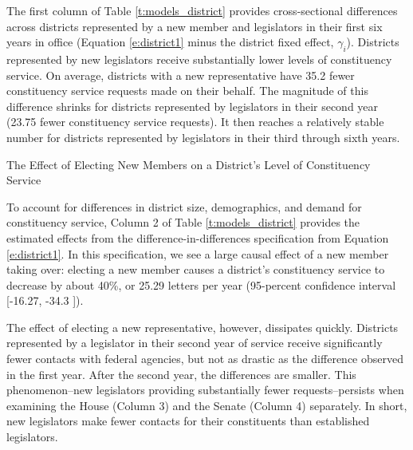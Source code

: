 \documentclass[12pt]{article}
\begin{document}
The first column of Table \ref{t:models_district} provides cross-sectional differences across districts represented by a new member and legislators in their first six years in office (Equation \ref{e:district1} minus the district fixed effect, $\gamma_{i}$). Districts represented by new legislators receive substantially lower levels of constituency service. On average, districts with a new representative have 35.2 fewer constituency service requests made on their behalf. The magnitude of this difference shrinks for districts represented by legislators in their second year (23.75 fewer constituency service requests). It then reaches a relatively stable number for districts represented by legislators in their third through sixth years. %



\begin{table}[hbt!]
\caption{The Effect of Electing New Members on a District's Level of Constituency Service} \label{t:models_district}
\begin{minipage}{\textwidth}
\begin{center}

\end{center}
\end{minipage}
\end{table}


To account for differences in district size, demographics, and demand for constituency service, Column 2 of Table \ref{t:models_district} provides the estimated effects from the difference-in-differences specification from Equation \ref{e:district1}. In this specification, we see a large causal effect of a new member taking over: electing a new member causes a district’s constituency service to decrease by about 40\%, or 25.29 letters per year (95-percent confidence interval [-16.27, -34.3 ]).

The effect of electing a new representative, however, dissipates quickly. Districts represented by a legislator in their second year of service receive significantly fewer contacts with federal agencies, but not as drastic as the difference observed in the first year. After the second year, the differences are smaller. This phenomenon–new legislators providing substantially fewer requests–persists when examining the House (Column 3) and the Senate (Column 4) separately. In short, new legislators make fewer contacts for their constituents than established legislators.
\end{document}
